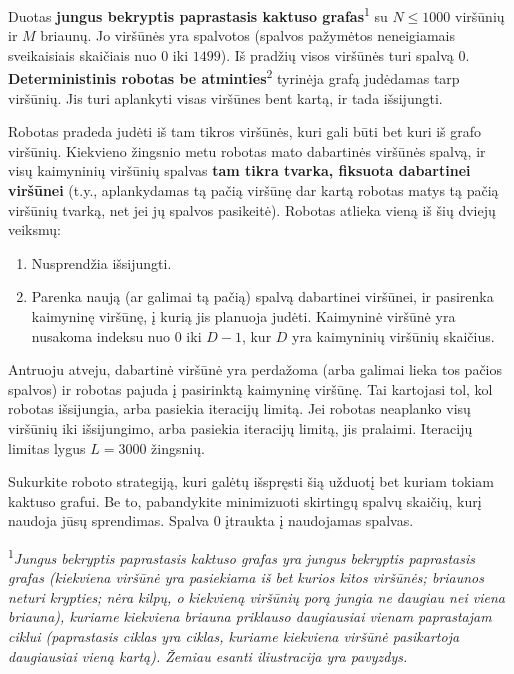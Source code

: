 \documentclass[12pt]{article}
\begin{document}
\renewcommand{\round}{2-oji diena}
\renewcommand{\problemName}{Užduotis: Navigacija}
\renewcommand{\lang}{Lithuanian}

\renewcommand{\tl}{$3$ sek.}
\renewcommand{\ml}{$512$ MB}
\problem{\problemName}

Duotas \textbf{jungus bekryptis paprastasis kaktuso grafas}\textsuperscript{1} su $N \leq 1000$ viršūnių ir $M$ briaunų. Jo viršūnės yra spalvotos (spalvos pažymėtos neneigiamais sveikaisiais skaičiais nuo $0$ iki $1499$). Iš pradžių visos viršūnės turi spalvą $0$. \textbf{Deterministinis robotas be atminties}\textsuperscript{2} tyrinėja grafą judėdamas tarp viršūnių. Jis turi aplankyti visas viršūnes bent kartą, ir tada išsijungti.

Robotas pradeda judėti iš tam tikros viršūnės, kuri gali būti bet kuri iš grafo viršūnių. Kiekvieno žingsnio metu robotas mato dabartinės viršūnės spalvą, ir visų kaimyninių viršūnių spalvas \textbf{tam tikra tvarka, fiksuota dabartinei viršūnei} (t.y., aplankydamas tą pačią viršūnę dar kartą robotas matys tą pačią viršūnių tvarką, net jei jų spalvos pasikeitė). Robotas atlieka vieną iš šių dviejų veiksmų:
\begin{enumerate}
    \item Nusprendžia išsijungti.
    \item Parenka naują (ar galimai tą pačią) spalvą dabartinei viršūnei, ir pasirenka kaimyninę viršūnę, į kurią jis planuoja judėti. Kaimyninė viršūnė yra nusakoma indeksu nuo $0$ iki $D-1$, kur $D$ yra kaimyninių viršūnių skaičius.
\end{enumerate}

Antruoju atveju, dabartinė viršūnė yra perdažoma (arba galimai lieka tos pačios spalvos) ir robotas pajuda į pasirinktą kaimyninę viršūnę. Tai kartojasi tol, kol robotas išsijungia, arba pasiekia iteracijų limitą. Jei robotas neaplanko visų viršūnių iki išsijungimo, arba pasiekia iteracijų limitą, jis pralaimi. Iteracijų limitas lygus $L = 3000$ žingsnių.

Sukurkite roboto strategiją, kuri galėtų išspręsti šią užduotį bet kuriam tokiam kaktuso grafui. Be to, pabandykite minimizuoti skirtingų spalvų skaičių, kurį naudoja jūsų sprendimas. Spalva $0$ įtraukta į naudojamas spalvas.

\textsuperscript{1}\textit{Jungus bekryptis paprastasis kaktuso grafas yra jungus bekryptis paprastasis grafas (kiekviena viršūnė yra pasiekiama iš bet kurios kitos viršūnės; briaunos neturi krypties; nėra kilpų, o kiekvieną viršūnių porą jungia ne daugiau nei viena briauna), kuriame kiekviena briauna priklauso daugiausiai vienam paprastajam ciklui (paprastasis ciklas yra ciklas, kuriame kiekviena viršūnė pasikartoja daugiausiai vieną kartą). Žemiau esanti iliustracija yra pavyzdys.}
\end{document}

